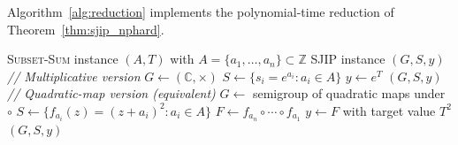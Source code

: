 \documentclass[journal,twocolumn]{IEEEtran}
\theoremstyle{definition}
\theoremstyle{plain}
\newcommand{\C}{\mathbb{C}}
\newcommand{\Z}{\mathbb{Z}}
\begin{document}
Algorithm~\ref{alg:reduction} implements the polynomial-time
reduction of Theorem~\ref{thm:sjip_nphard}.

\begin{algorithm}[H]
\caption{Polynomial-Time Reduction: \textsc{Subset-Sum} to SJIP}
\label{alg:reduction}
\begin{algorithmic}[1]
\Require \textsc{Subset-Sum} instance $(A, T)$ with
         $A = \{a_1,\ldots,a_n\} \subset \Z$
\Ensure SJIP instance $(G, S, y)$
\State \textit{// Multiplicative version}
\State $G \leftarrow (\C, \times)$
\State $S \leftarrow \{s_i = e^{a_i} : a_i \in A\}$
\State $y \leftarrow e^T$
\Return $(G, S, y)$
\State \textit{// Quadratic-map version (equivalent)}
\State $G \leftarrow$ semigroup of quadratic maps under $\circ$
\State $S \leftarrow \{f_{a_i}(z) = (z+a_i)^2 : a_i \in A\}$
\State $F \leftarrow f_{a_n} \circ \cdots \circ f_{a_1}$
\State $y \leftarrow F$ with target value $T^2$
\Return $(G, S, y)$
\end{algorithmic}
\end{algorithm}
\end{document}

